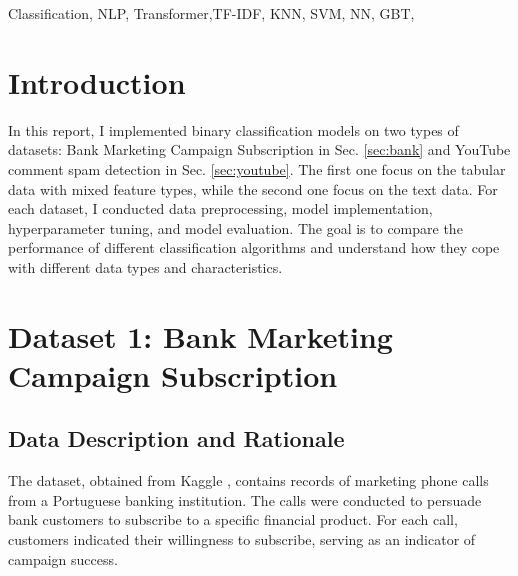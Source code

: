 \documentclass[conference]{IEEEtran}
\begin{document}

\begin{IEEEkeywords}
Classification, NLP, Transformer,TF-IDF, KNN, SVM, NN, GBT, 
\end{IEEEkeywords}

\section{Introduction}
In this report, I implemented binary classification models  on two types of datasets: Bank Marketing Campaign Subscription in Sec. \ref{sec:bank} and YouTube comment spam detection in Sec. \ref{sec:youtube}. The first one focus on the tabular data with mixed feature types, while the second one focus on the text data. For each dataset, I conducted data preprocessing, model implementation, hyperparameter tuning, and model evaluation. The goal is to compare the performance of different classification algorithms and understand how they cope with different data types and characteristics.

\section{Dataset 1: Bank Marketing Campaign Subscription \label{sec:bank}}

\subsection{Data Description and Rationale}
The dataset, obtained from Kaggle \cite{b1}, contains records of marketing phone calls from a Portuguese banking institution. The calls were conducted to persuade bank customers to subscribe to a specific financial product. For each call, customers indicated their willingness to subscribe, serving as an indicator of campaign success.
\end{document}
